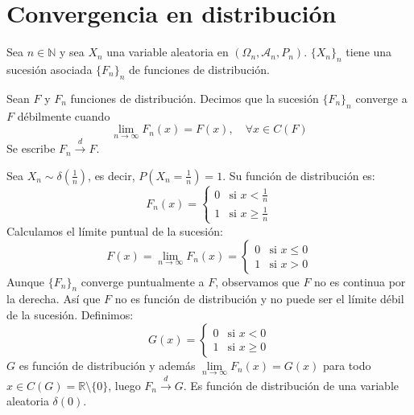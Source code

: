 \section{Convergencia en distribución}

Sea $n \in \mathbb{N}$ y sea $X_n$ una variable aleatoria en $(\Omega_n, \mathcal{A}_n, P_n)$.
$\{X_n\}_n$ tiene una sucesión asociada $\{F_n\}_n$ de funciones de distribución.

\begin{definition}
    Sean $F$ y $F_n$ funciones de distribución.
    Decimos que la sucesión $\{F_n\}_n$ converge a $F$ débilmente cuando
    $$\lim\limits_{n \to \infty} F_n(x) = F(x), \quad \forall x \in C(F)$$
    Se escribe $F_n \xrightarrow{d} F$.
\end{definition}

\begin{example}
    Sea $X_n \sim \delta(\frac{1}{n})$, es decir, $P(X_n = \frac{1}{n}) = 1$.
    Su función de distribución es:
    $$F_n(x) = \begin{cases}
            0 & \text{si } x < \frac{1}{n}    \\
            1 & \text{si } x \geq \frac{1}{n}
        \end{cases}$$
    Calculamos el límite puntual de la sucesión:
    $$F(x) = \lim\limits_{n \to \infty} F_n(x) = \begin{cases}
            0 & \text{si } x \leq 0 \\
            1 & \text{si } x > 0
        \end{cases}$$
    Aunque $\{F_n\}_n$ converge puntualmente a $F$, observamos que $F$ no es continua por la derecha.
    Así que $F$ no es función de distribución y no puede ser el límite débil de la sucesión.
    Definimos:
    $$G(x) = \begin{cases}
            0 & \text{si } x < 0    \\
            1 & \text{si } x \geq 0
        \end{cases}$$
    $G$ es función de distribución y además $\lim\limits_{n \to \infty} F_n(x) = G(x)$ para todo $x \in C(G) = \mathbb{R} \setminus \{0\}$, luego $F_n \xrightarrow{d} G$.
    Es función de distribución de una variable aleatoria $\delta(0)$.
\end{example}

